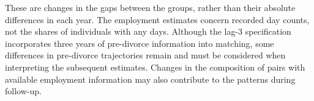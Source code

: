 \documentclass[a4paper,12pt]{article}
\theoremstyle{plain}
\theoremstyle{definition}
\theoremstyle{TheoremNum}
\theoremstyle{CorollaryNum}
\theoremstyle{PropositionNum}
\theoremstyle{TheoremNum}
\begin{document}
These are changes in the gaps between the groups, rather than their absolute differences in each year. The employment estimates concern recorded day counts, not the shares of individuals with any days. Although the lag-3 specification incorporates three years of pre-divorce information into matching, some differences in pre-divorce trajectories remain and must be considered when interpreting the subsequent estimates. Changes in the composition of pairs with available employment information may also contribute to the patterns during follow-up.



\end{document}
